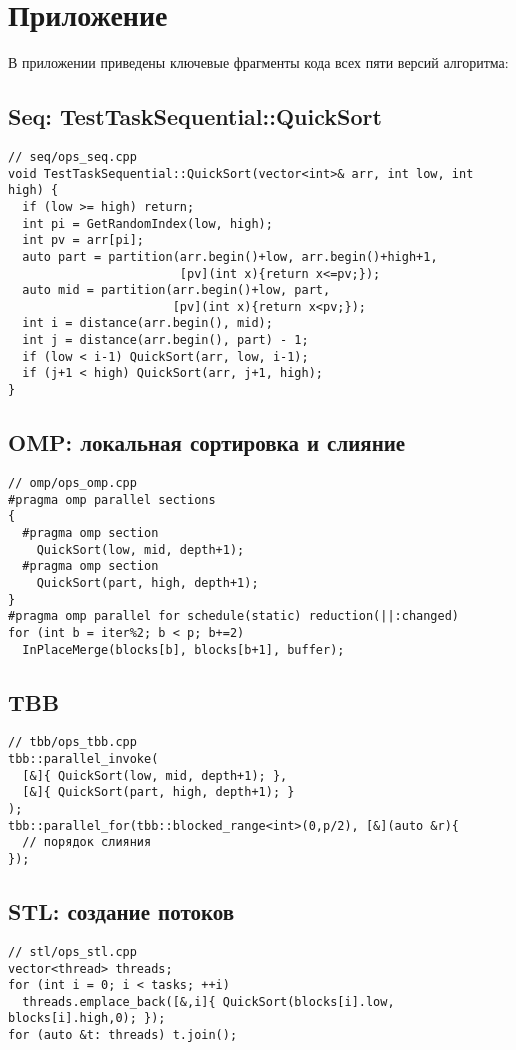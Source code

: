 \documentclass[12pt]{article}
\begin{document}
\appendix
\section*{Приложение}
\hspace*{1.25em}В приложении приведены ключевые фрагменты кода всех пяти версий алгоритма:

\subsection*{Seq: TestTaskSequential::QuickSort}
\begin{lstlisting}
// seq/ops_seq.cpp
void TestTaskSequential::QuickSort(vector<int>& arr, int low, int high) {
  if (low >= high) return;
  int pi = GetRandomIndex(low, high);
  int pv = arr[pi];
  auto part = partition(arr.begin()+low, arr.begin()+high+1,
                        [pv](int x){return x<=pv;});
  auto mid = partition(arr.begin()+low, part,
                       [pv](int x){return x<pv;});
  int i = distance(arr.begin(), mid);
  int j = distance(arr.begin(), part) - 1;
  if (low < i-1) QuickSort(arr, low, i-1);
  if (j+1 < high) QuickSort(arr, j+1, high);
}
\end{lstlisting}

\subsection*{OMP: локальная сортировка и слияние}
\begin{lstlisting}
// omp/ops_omp.cpp
#pragma omp parallel sections
{
  #pragma omp section
    QuickSort(low, mid, depth+1);
  #pragma omp section
    QuickSort(part, high, depth+1);
}
#pragma omp parallel for schedule(static) reduction(||:changed)
for (int b = iter%2; b < p; b+=2)
  InPlaceMerge(blocks[b], blocks[b+1], buffer);
\end{lstlisting}

\subsection*{TBB}
\begin{lstlisting}
// tbb/ops_tbb.cpp
tbb::parallel_invoke(
  [&]{ QuickSort(low, mid, depth+1); },
  [&]{ QuickSort(part, high, depth+1); }
);
tbb::parallel_for(tbb::blocked_range<int>(0,p/2), [&](auto &r){
  // порядок слияния
});
\end{lstlisting}

\subsection*{STL: создание потоков}
\begin{lstlisting}
// stl/ops_stl.cpp
vector<thread> threads;
for (int i = 0; i < tasks; ++i)
  threads.emplace_back([&,i]{ QuickSort(blocks[i].low, blocks[i].high,0); });
for (auto &t: threads) t.join();
\end{lstlisting}
\end{document}
